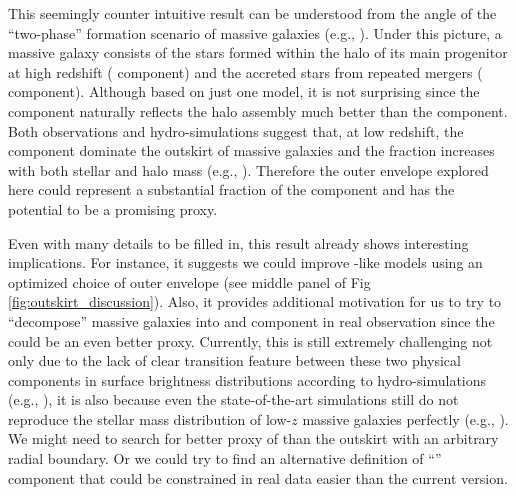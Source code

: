\documentclass[fleqn,usenatbib,useAMS,english]{mnras}
\begin{document}
    This seemingly counter intuitive result can 
    be understood from the angle of the ``two-phase'' formation scenario of massive galaxies
    (e.g., \citealt{Oser2010, vanDokkum2010, Moster2020}).
    Under this picture, a massive galaxy consists of the stars formed within the halo of its main 
    progenitor at high redshift (\insitu{} component) and the accreted stars from repeated mergers 
    (\exsitu{} component).
    Although based on just one model, it is not surprising since the \exsitu{} component
    naturally reflects the halo assembly much better than the \insitu{} component.
    Both observations and hydro-simulations suggest that, at low redshift, the \exsitu{} 
    component dominate the outskirt of massive galaxies and the \exsitu{} fraction increases 
    with both stellar and halo mass 
    (e.g., \citealt{Lackner2012, RodriguezGomez2016, Pulsoni2021, Pillepich2017b}).
    Therefore the outer envelope \mstar{} explored here could represent a substantial fraction
    of the \exsitu{} component and has the potential to be a promising \mvir{} proxy.
    
    Even with many details to be filled in, this result already shows interesting implications. 
    For instance, it suggests we could improve \asap{}-like models using an
    optimized choice of outer envelope \mstar{} 
    (see middle panel of Fig \ref{fig:outskirt_discussion}).
    Also, it provides additional motivation for us to try to ``decompose'' massive galaxies into
    \insitu{} and \exsitu{} component in real observation since the \exsitu{} \mstar{} could 
    be an even better \mvir{} proxy.
    Currently, this is still extremely challenging not only due to the lack of clear transition 
    feature between these two physical components in surface brightness distributions according
    to hydro-simulations (e.g., \citealt{Remus2021}), it is also because even the 
    state-of-the-art simulations still do not reproduce the stellar mass distribution of 
    low-$z$ massive galaxies perfectly (e.g., \citealt{Ardila2021}).
    We might need to search for better proxy of \exsitu{} \mstar{} than the outskirt \mstar{}
    with an arbitrary radial boundary. 
    Or we could try to find an alternative definition of ``\exsitu{}'' component that could 
    be constrained in real data easier than the current version.
\end{document}
